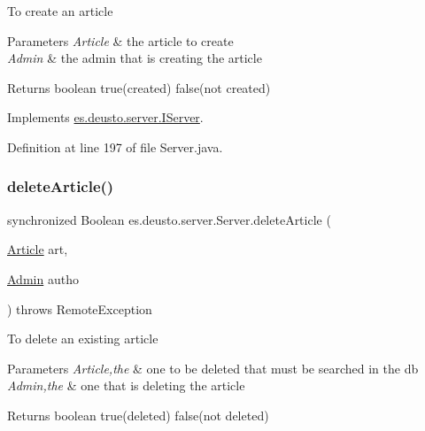 To create an article


\begin{DoxyParams}{Parameters}
{\em Article} & the article to create \\
\hline
{\em Admin} & the admin that is creating the article \\
\hline
\end{DoxyParams}
\begin{DoxyReturn}{Returns}
boolean true(created) false(not created) 
\end{DoxyReturn}


Implements \hyperlink{interfacees_1_1deusto_1_1server_1_1_i_server_a74b3203c5a8d94e91004df0dc84ca386}{es.\+deusto.\+server.\+I\+Server}.



Definition at line 197 of file Server.\+java.

\mbox{\label{classes_1_1deusto_1_1server_1_1_server_ad9d8810833b631866924dc481801614a}} 
\subsubsection{\texorpdfstring{delete\+Article()}{deleteArticle()}}
{\footnotesize\ttfamily synchronized Boolean es.\+deusto.\+server.\+Server.\+delete\+Article (\begin{DoxyParamCaption}\item[{\hyperlink{classes_1_1deusto_1_1server_1_1jdo_1_1_article}{Article}}]{art,  }\item[{\hyperlink{classes_1_1deusto_1_1server_1_1jdo_1_1_admin}{Admin}}]{autho }\end{DoxyParamCaption}) throws Remote\+Exception}

To delete an existing article


\begin{DoxyParams}{Parameters}
{\em Article,the} & one to be deleted that must be searched in the db \\
\hline
{\em Admin,the} & one that is deleting the article \\
\hline
\end{DoxyParams}
\begin{DoxyReturn}{Returns}
boolean true(deleted) false(not deleted) 
\end{DoxyReturn}



